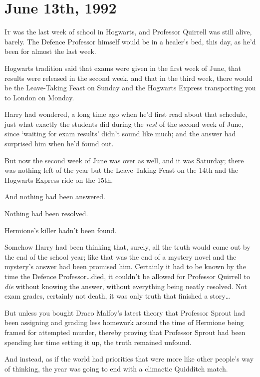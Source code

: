 
\section{June 13th, 1992}

\lettrine{I}{t} was the last week of school in Hogwarts, and Professor Quirrell was still alive, barely. The Defence Professor himself would be in a healer’s bed, this day, as he’d been for almost the last week.

Hogwarts tradition said that exams were given in the first week of June, that results were released in the second week, and that in the third week, there would be the Leave-Taking Feast on Sunday and the Hogwarts Express transporting you to London on Monday.

Harry had wondered, a long time ago when he’d first read about that schedule, just what exactly the students did during the \emph{rest} of the second week of June, since ‘waiting for exam results’ didn’t sound like much; and the answer had surprised him when he’d found out.

But now the second week of June was over as well, and it was Saturday; there was nothing left of the year but the Leave-Taking Feast on the 14th and the Hogwarts Express ride on the 15th.

And nothing had been answered.

Nothing had been resolved.

Hermione’s killer hadn’t been found.

Somehow Harry had been thinking that, surely, all the truth would come out by the end of the school year; like that was the end of a mystery novel and the mystery’s answer had been promised him. Certainly it had to be known by the time the Defence Professor…died, it couldn’t be allowed for Professor Quirrell to \emph{die} without knowing the answer, without everything being neatly resolved. Not exam grades, certainly not death, it was only truth that finished a story…

But unless you bought Draco Malfoy’s latest theory that Professor Sprout had been assigning and grading less homework around the time of Hermione being framed for attempted murder, thereby proving that Professor Sprout had been spending her time setting it up, the truth remained unfound.

And instead, as if the world had priorities that were more like other people’s way of thinking, the year was going to end with a climactic Quidditch match.

